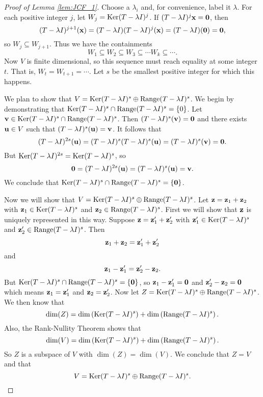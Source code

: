  \begin{proof}[Proof of Lemma \ref{lem:JCF_1}] Choose a $\lambda_i$ and, for convenience, label it $\lambda$. For each positive integer $j$, let $W_j = \text{Ker}(T - \lambda I)^j$. If $(T-\lambda I)^j\mathbf{x} = \mathbf{0}$, then 
 \[(T-\lambda I)^{j+1}(\mathbf{x}) = (T-\lambda I) (T-\lambda I)^j(\mathbf{x}) = (T-\lambda I)(\mathbf{0}) = \mathbf{0},\]
  so $W_j \subseteq W_{j+1}$. Thus we have the containments
 \[W_1 \subseteq W_2 \subseteq W_3 \subseteq \cdots W_k \subseteq \cdots.\]
 Now $V$ is finite dimensional, so this sequence must reach equality at some integer $t$. That is, $W_t = W_{t+1} = \cdots$. Let $s$ be the smallest positive integer for which this happens. 
 
We plan to show that $V = \text{Ker}(T - \lambda I)^s \oplus \text{Range}(T - \lambda I)^s$. We begin by demonstrating that $\text{Ker}(T - \lambda I)^s\cap \text{Range}(T - \lambda I)^s = \{0\}$. Let $\mathbf{v} \in \text{Ker}(T - \lambda I)^s \cap \text{Range}(T - \lambda I)^s$. Then $(T - \lambda I)^s(\mathbf{v}) = \mathbf{0}$ and there exists $\mathbf{u} \in V$ such that $(T-\lambda I)^s(\mathbf{u}) = \mathbf{v}$. It follows that 
 \[(T-\lambda I)^{2s}(\mathbf{u}) = (T-\lambda I)^s(T-\lambda I)^{s}(\mathbf{u}) = (T-\lambda I)^s(\mathbf{v}) = \mathbf{0}.\]
 But $\text{Ker}(T - \lambda I)^{2s} = \text{Ker}(T- \lambda I)^s$, so 
 \[\mathbf{0} = (T-\lambda I)^{2s}(\mathbf{u}) = (T-\lambda I)^{s}(\mathbf{u}) = \mathbf{v}.\]
 We conclude that $\text{Ker}(T - \lambda I)^s \cap \text{Range}(T - \lambda I)^s = \{\mathbf{0}\}$.
 
 Now we will show that $V =  \text{Ker}(T - \lambda I)^s \oplus \text{Range}(T - \lambda I)^s$. Let $\mathbf{z} = \mathbf{z}_1 + \mathbf{z}_2$ with $\mathbf{z}_1 \in  \text{Ker}(T - \lambda I)^s$ and $\mathbf{z}_2 \in  \text{Range}(T - \lambda I)^s$. First we will show that $\mathbf{z}$ is uniquely represented in this way. Suppose $\mathbf{z} = \mathbf{z}'_1+\mathbf{z}'_2$ with $\mathbf{z}'_1 \in  \text{Ker}(T - \lambda I)^s$ and $\mathbf{z}'_2 \in  \text{Range}(T - \lambda I)^s$. Then 
 \[\mathbf{z}_1+\mathbf{z}_2 = \mathbf{z}'_1+\mathbf{z}'_2\]
 and 
 \[\mathbf{z}_1-\mathbf{z}'_1 = \mathbf{z}'_2-\mathbf{z}_2.\]
 But $\text{Ker}(T - \lambda I)^s \cap \text{Range}(T - \lambda I)^s = \{\mathbf{0}\}$, so $\mathbf{z}_1-\mathbf{z}'_1 = \mathbf{0}$ and $\mathbf{z}'_2-\mathbf{z}_2=\mathbf{0}$ which means $\mathbf{z}_1=\mathbf{z}'_1$ and $\mathbf{z}_2 = \mathbf{z}'_2$. Now let $Z =  \text{Ker}(T - \lambda I)^s \oplus \text{Range}(T - \lambda I)^s$. We then know that 
 \[\dim(Z) = \dim\left(\text{Ker}(T - \lambda I)^s\right) + \dim\left(\text{Range}(T - \lambda I)^s\right).\]
 Also, the Rank-Nullity Theorem shows that 
 \[\dim(V) =  \dim\left(\text{Ker}(T - \lambda I)^s\right) + \dim\left(\text{Range}(T - \lambda I)^s\right).\]
So $Z$ is a subspace of $V$ with $\dim(Z) = \dim(V)$. We conclude that $Z = V$ and that
\[V =  \text{Ker}(T - \lambda I)^s \oplus \text{Range}(T - \lambda I)^s.\]


\end{proof}
